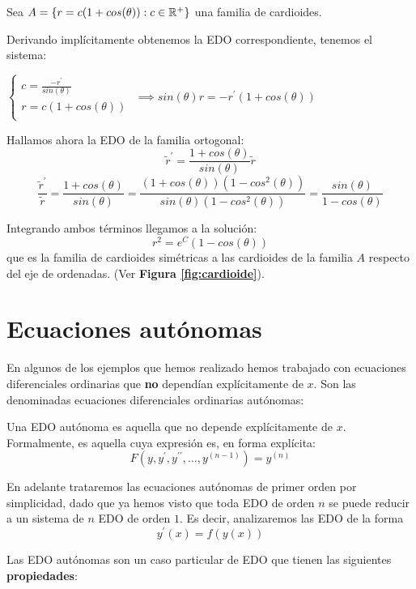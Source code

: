 \documentclass{mathnotes}
\begin{document}
\begin{example}
Sea $A = \{ r=c(1+cos(\theta)) : c \in \mathbb{R}^+ \}$ una familia de cardioides.

Derivando implícitamente obtenemos la EDO correspondiente, tenemos el sistema:
\begin{center}
$
\left\lbrace
  \begin{array}{l}
     c = \frac{-r^\prime}{sin(\theta)} \\
     r = c(1+cos(\theta))  \\
  \end{array}
\right.
$
$\implies sin(\theta)r = -r^\prime(1+cos(\theta))$
\end{center}
Hallamos ahora la EDO de la familia ortogonal:
$$\tilde{r}^\prime = \frac{1+cos(\theta)}{sin(\theta)}\tilde{r}$$
$$\frac{\tilde{r}^\prime}{\tilde{r}} = \frac{1+cos(\theta)}{sin(\theta)} = \frac{(1+cos(\theta))(1-cos^2(\theta))}{sin(\theta)(1-cos^2(\theta))} = \frac{sin(\theta)}{1-cos(\theta)}$$

Integrando ambos términos llegamos a la solución: 
$$r^2 = e^C(1-cos(\theta))$$
que es la familia de cardioides simétricas a las cardioides de la familia $A$ respecto del eje de ordenadas. (Ver \textbf{Figura \ref{fig:cardioide}}).
\end{example}

\section{Ecuaciones autónomas}
En algunos de los ejemplos que hemos realizado hemos trabajado con ecuaciones diferenciales ordinarias que \textbf{no} dependían explícitamente de $x$. Son las denominadas ecuaciones diferenciales ordinarias autónomas:

\begin{definition}
Una EDO autónoma es aquella que no depende explícitamente de $x$. Formalmente, es aquella cuya expresión es, en forma explícita: $$F(y, y^\prime, y^{\prime\prime}, \hdots, y^{(n-1)}) = y^{(n)}$$
\end{definition}

En adelante trataremos las ecuaciones autónomas de primer orden por simplicidad, dado que ya hemos visto que toda EDO de orden $n$ se puede reducir a un sistema de $n$ EDO de orden $1$. Es decir, analizaremos las EDO de la forma $$y^\prime(x) = f(y(x))$$

Las EDO autónomas son un caso particular de EDO que tienen las siguientes \textbf{propiedades}:
\end{document}
